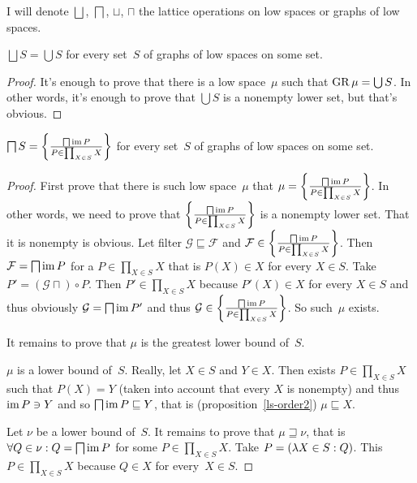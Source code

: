 I will denote $\bigsqcup$, $\bigsqcap$, $\sqcup$, $\sqcap$ the lattice operations on low spaces or graphs of low spaces.

\begin{prop}
$\bigsqcup S=\bigcup S$ for every set~$S$ of graphs of low spaces on some set.
\end{prop}

\begin{proof}
It's enough to prove that there is a low space~$\mu$ such that $\operatorname{GR}\mu=\bigcup S$. In other words, it's enough to prove
that $\bigcup S$ is a nonempty lower set, but that's obvious. 
\end{proof}

\begin{prop}
$\bigsqcap S=\left\{ \frac{\bigsqcap\operatorname{im} P}{P\in\prod_{X\in S} X}\right\}$ for every set~$S$ of graphs of low spaces on some set.
\end{prop}

\begin{proof}
First prove that there is such low space~$\mu$ that $\mu=\left\{ \frac{\bigsqcap\operatorname{im} P}{P\in\prod_{X\in S} X}\right\}$. In other words,
we need to prove that $\left\{ \frac{\bigsqcap\operatorname{im} P}{P\in\prod_{X\in S} X}\right\}$ is a nonempty lower set. That it is nonempty is obvious.
Let filter $\mathcal{G}\sqsubseteq\mathcal{F}$ and $\mathcal{F}\in\left\{ \frac{\bigsqcap\operatorname{im} P}{P\in\prod_{X\in S} X}\right\}$. Then
$\mathcal{F}=\bigsqcap\operatorname{im} P$ for a $P\in\prod_{X\in S} X$ that is $P(X)\in X$ for every $X\in S$. Take $P'=(\mathcal{G}\sqcap)\circ P$.
Then $P'\in\prod_{X\in S} X$ because $P'(X)\in X$ for every $X\in S$ and thus
obviously $\mathcal{G}=\bigsqcap\operatorname{im} P'$ and thus $\mathcal{G}\in\left\{ \frac{\bigsqcap\operatorname{im} P}{P\in\prod_{X\in S} X}\right\}$. So such~$\mu$ exists.

It remains to prove that $\mu$ is the greatest lower bound of~$S$.

$\mu$ is a lower bound of~$S$. Really, let $X\in S$ and $Y\in X$.
Then exists $P\in\prod_{X\in S} X$ such that $P(X)=Y$ (taken into account that every $ X$ is nonempty)
and thus $\operatorname{im} P\ni Y$ and so $\bigsqcap\operatorname{im} P\sqsubseteq Y$, that is (proposition~\ref{ls-order2}) $\mu\sqsubseteq X$.

Let $\nu$ be a lower bound of~$S$. It remains to prove that $\mu\sqsupseteq\nu$, that is
$\forall Q\in\nu: Q=\bigsqcap\operatorname{im} P$ for some $P\in\prod_{X\in S} X$.
Take $P=(\lambda X\in S:Q)$. This $P\in\prod_{X\in S} X$ because $Q\in X$ for every~$X\in S$.
\end{proof}

